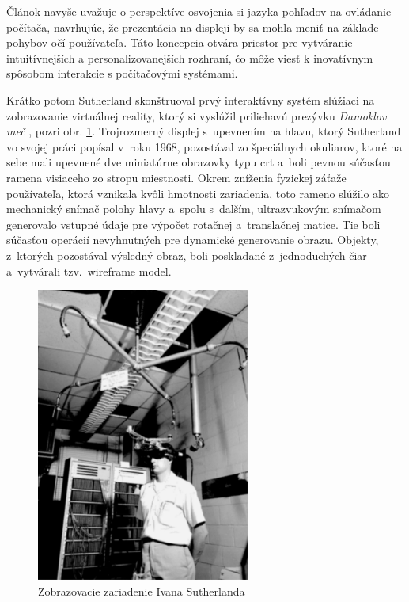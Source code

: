 Článok navyše uvažuje o perspektíve osvojenia si jazyka pohľadov na ovládanie počítača, navrhujúc, že prezentácia na displeji by sa mohla meniť na základe pohybov 
očí používateľa. Táto koncepcia otvára priestor pre vytváranie intuitívnejších a personalizovanejších rozhraní, čo môže viesť k inovatívnym spôsobom interakcie 
s počítačovými systémami.

Krátko potom Sutherland skonštruoval prvý interaktívny systém slúžiaci na zobrazovanie virtuálnej reality, ktorý si vyslúžil priliehavú prezývku 
\emph{Damoklov meč} \cite[5]{schmalstiegAugmentedRealityPrinciples2016}, pozri obr. \ref{sutherland-device}. Trojrozmerný displej s~upevnením na hlavu, ktorý 
Sutherland vo svojej práci \cite{sutherlandHeadmountedThreeDimensional1968} popísal v~roku 1968, pozostával zo špeciálnych okuliarov, 
ktoré na sebe mali upevnené dve miniatúrne obrazovky typu \acrshort{crt} a~boli pevnou súčasťou ramena visiaceho zo stropu miestnosti. 
Okrem zníženia fyzickej záťaže používateľa, ktorá vznikala kvôli hmotnosti zariadenia, toto rameno slúžilo ako mechanický snímač polohy hlavy a~spolu s~ďalším, 
ultrazvukovým snímačom generovalo vstupné údaje pre výpočet rotačnej a~translačnej matice. Tie boli súčasťou operácií nevyhnutných pre dynamické generovanie obrazu. 
Objekty, z~ktorých pozostával výsledný obraz, boli poskladané z~jednoduchých čiar a~vytvárali tzv.~wireframe model.

\begin{figure}[!htbp]
  \centering
  \includegraphics[width=7cm]{img/display-device-Ivan-Sutherland-Harvard-University-1967.jpg}
  \caption{Zobrazovacie zariadenie Ivana Sutherlanda}
  \label{sutherland-device}
\end{figure}	

